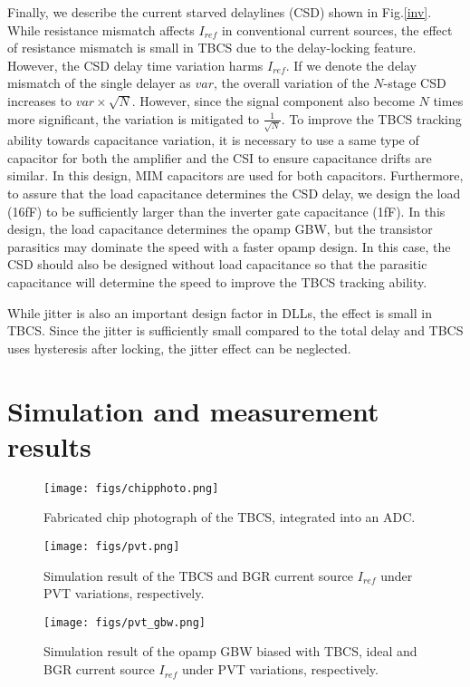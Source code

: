 \documentclass[paper]{ieice}
\begin{document}
\qquad Finally, we describe the current starved delaylines (CSD) shown in Fig.\ref{inv}. While resistance mismatch affects $I_{ref}$ in conventional current sources, the effect of resistance mismatch is small in TBCS due to the delay-locking feature. However, the CSD delay time variation harms $I_{ref}$.
If we denote the delay mismatch of the single delayer as $var$, the overall variation of the $N$-stage CSD increases to $var \times \sqrt{N}$. However, since the signal component also become  $N$ times more significant, the variation is mitigated to $\frac{1}{\sqrt{N}}$.
To improve the TBCS tracking ability towards capacitance variation, it is necessary to use a same type of capacitor for both the amplifier and the CSI to ensure capacitance drifts are similar. In this design, MIM capacitors are used for both capacitors. Furthermore, to assure that the load capacitance determines the CSD delay, we design the load (16fF) to be sufficiently larger than the inverter gate capacitance (1fF).
In this design, the load capacitance determines the opamp GBW, but the transistor parasitics may dominate the speed with a faster opamp design. In this case, the CSD should also be designed without load capacitance so that the parasitic capacitance will determine the speed to improve the TBCS tracking ability.

While jitter is also an important design factor in DLLs, the effect is small in TBCS. Since the jitter is sufficiently small compared to the total delay and TBCS uses hysteresis after locking, the jitter effect can be neglected.

\section{Simulation and measurement results}
\begin{figure}[!t]
\centering
 \texttt{[image: figs/chipphoto.png]}
  \caption{Fabricated chip photograph of the TBCS, integrated into an ADC.}
\label{chip}
\end{figure}

\begin{figure}[!t]
\centering
 \texttt{[image: figs/pvt.png]}
  \caption{Simulation result of the TBCS and BGR current source $I_{ref}$ under PVT variations, respectively.
}
\label{iref_pvt_both}
\end{figure}

\begin{figure}[!t]
\centering
 \texttt{[image: figs/pvt\_gbw.png]}
  \caption{Simulation result of the opamp GBW biased with TBCS, ideal and BGR current source $I_{ref}$ under PVT variations, respectively.
}
\label{iref_gbw}
\end{figure}
\end{document}
